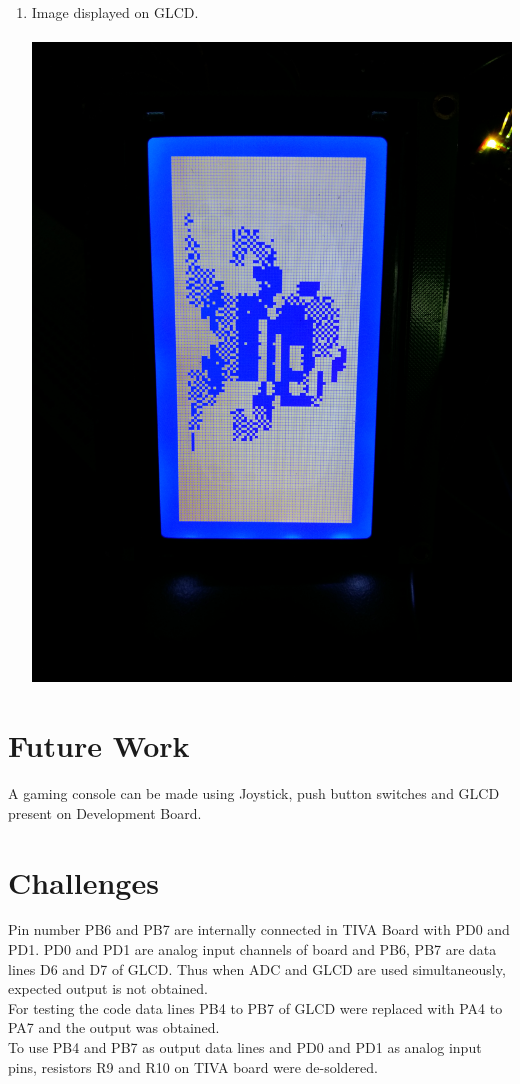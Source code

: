 \documentclass[a4paper,12pt,oneside]{book}
\begin{document}
\begin{enumerate}
\item Image displayed on GLCD.\\~\\
\includegraphics[scale=0.07]{20160706_152740.jpg}

\end{enumerate}


\section{Future Work}
A gaming console can be made using Joystick, push button switches and GLCD present on Development Board.


\section{Challenges}
Pin number PB6 and PB7 are internally connected in TIVA Board with PD0 and PD1. PD0 and PD1 are analog input channels of board and PB6, PB7 are data lines D6 and D7 of GLCD. Thus when ADC and GLCD are used simultaneously, expected output is not obtained. \\
For testing the code data lines PB4 to PB7 of GLCD were replaced with PA4 to PA7 and the output was obtained.\\
To use PB4 and PB7 as output data lines and PD0 and PD1 as analog input pins, resistors R9 and R10 on TIVA board were de-soldered.
\end{document}

